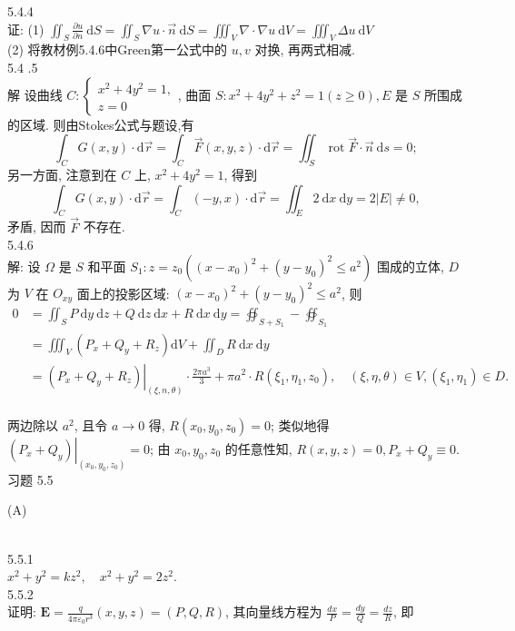 \documentclass[a4paper,11pt,UTF8]{article}
\begin{document}
5.4.4\\
证: (1) $\iint_S \frac{\partial u}{\partial n} \mathrm{~d} S=\iint_S \nabla u \cdot \vec{n} \mathrm{~d} S=\iiint_V \nabla \cdot \nabla u \mathrm{~d} V=\iiint_V \Delta u \mathrm{~d} V$\\
(2) 将教材例5.4.6中Green第一公式中的 $u, v$ 对换, 再两式相减.\\
5.4 .5\\
解 设曲线 $C:\left\{\begin{array}{l}x^2+4 y^2=1, \\ z=0\end{array}\right.$, 曲面 $S: x^2+4 y^2+z^2=1(z \geq 0), E$ 是 $S$ 所围成 的区域. 则由Stokes公式与题设,有
$$
\int_C G(x, y) \cdot \mathrm{d} \vec{r}=\int_C \vec{F}(x, y, z) \cdot \mathrm{d} \vec{r}=\iint_S \operatorname{rot} \vec{F} \cdot \vec{n} \mathrm{~d} s=0 ;
$$
另一方面, 注意到在 $C$ 上, $x^2+4 y^2=1$, 得到
$$
\int_C G(x, y) \cdot \mathrm{d} \vec{r}=\int_C(-y, x) \cdot \mathrm{d} \vec{r}=\iint_E 2 \mathrm{~d} x \mathrm{~d} y=2|E| \neq 0,
$$
矛盾, 因而 $\vec{F}$ 不存在.\\
5.4.6\\
解: 设 $\Omega$ 是 $S$ 和平面 $S_1: z=z_0\left(\left(x-x_0\right)^2+\left(y-y_0\right)^2 \leq a^2\right)$ 围成的立体, $D$ 为 $V$ 在 $O_{x y}$ 面上的投影区域: $\left(x-x_0\right)^2+\left(y-y_0\right)^2 \leq a^2$, 则
$$
\begin{aligned}
	0 & =\iint_S P \mathrm{~d} y \mathrm{~d} z+Q \mathrm{~d} z \mathrm{~d} x+R \mathrm{~d} x \mathrm{~d} y=\oiint_{S+S_1}-\oiint_{S_1} \\
	& =\iiint_V\left(P_x+Q_y+R_z\right) \mathrm{d} V+\iint_D R \mathrm{~d} x \mathrm{~d} y \\
	& =\left.\left(P_x+Q_y+R_z\right)\right|_{(\xi, n, \theta)} \cdot \frac{2 \pi a^3}{3}+\pi a^2 \cdot R\left(\xi_1, \eta_1, z_0\right), \quad(\xi, \eta, \theta) \in V,\left(\xi_1, \eta_1\right) \in D .
\end{aligned}
$$\\
两边除以 $a^2$, 且令 $a \rightarrow 0$ 得, $R\left(x_0, y_0, z_0\right)=0$; 类似地得 $\left.\left(P_x+Q_y\right)\right|_{\left(x_0, y_0, z_0\right)}=0$; 由 $x_0, y_0, z_0$ 的任意性知, $R(x, y, z)=0, P_x+Q_y \equiv 0$.\\
习题 5.5\\
\centerline{(A)}\\
5.5.1\\
$x^2+y^2=k z^2, \quad x^2+y^2=2 z^2$.\\
5.5.2\\
证明: $\mathbf{E}=\frac{q}{4 \pi \varepsilon_0 r^3}(x, y, z)=(P, Q, R)$, 其向量线方程为 $\frac{d x}{P}=\frac{d y}{Q}=\frac{d z}{R}$, 即
\end{document}
